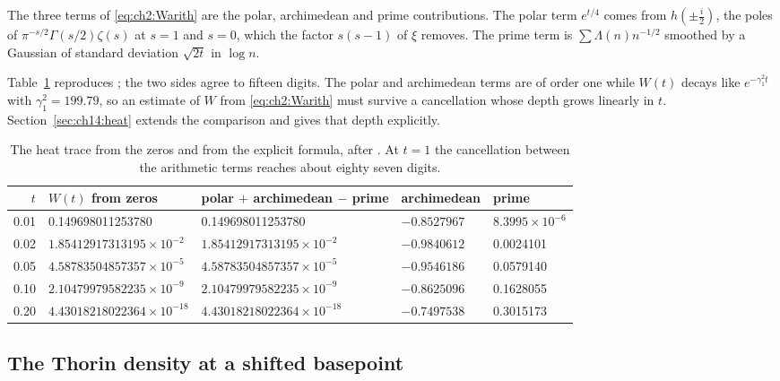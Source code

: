 The three terms of \eqref{eq:ch2:Warith} are the polar, archimedean and prime contributions. The polar term $e^{t/4}$ comes from $h(\pm\frac i2)$, the poles of $\pi^{-s/2}\Gamma(s/2)\zeta(s)$ at $s=1$ and $s=0$, which the factor $s(s-1)$ of $\xi$ removes. The prime term is $\sum\Lambda(n)n^{-1/2}$ smoothed by a Gaussian of standard deviation $\sqrt{2t}$ in $\log n$.

Table~\ref{tab:ch2:W} reproduces \cite[Table 4.1]{P26}; the two sides agree to fifteen digits. The polar and archimedean terms are of order one while $W(t)$ decays like $e^{-\gamma_1^2t}$ with $\gamma_1^2=199.79$, so an estimate of $W$ from \eqref{eq:ch2:Warith} must survive a cancellation whose depth grows linearly in $t$. Section~\ref{sec:ch14:heat} extends the comparison and gives that depth explicitly.

\begin{table}[htbp]
\centering\footnotesize\setlength{\tabcolsep}{4pt}
\begin{tabular}{@{}rllll@{}}
\toprule
$t$ & $W(t)$ from zeros & polar $+$ archimedean $-$ prime & archimedean & prime\\
\midrule
0.01 & 0.149698011253780 & 0.149698011253780 & $-0.8527967$ & $8.3995\times10^{-6}$\\
0.02 & $1.85412917313195\times10^{-2}$ & $1.85412917313195\times10^{-2}$ & $-0.9840612$ & 0.0024101\\
0.05 & $4.58783504857357\times10^{-5}$ & $4.58783504857357\times10^{-5}$ & $-0.9546186$ & 0.0579140\\
0.10 & $2.10479979582235\times10^{-9}$ & $2.10479979582235\times10^{-9}$ & $-0.8625096$ & 0.1628055\\
0.20 & $4.43018218022364\times10^{-18}$ & $4.43018218022364\times10^{-18}$ & $-0.7497538$ & 0.3015173\\
\bottomrule
\end{tabular}
\caption{The heat trace from the zeros and from the explicit formula, after \cite[Table 4.1]{P26}. At $t=1$ the cancellation between the arithmetic terms reaches about eighty seven digits.}
\label{tab:ch2:W}
\end{table}

\subsection{The Thorin density at a shifted basepoint}

